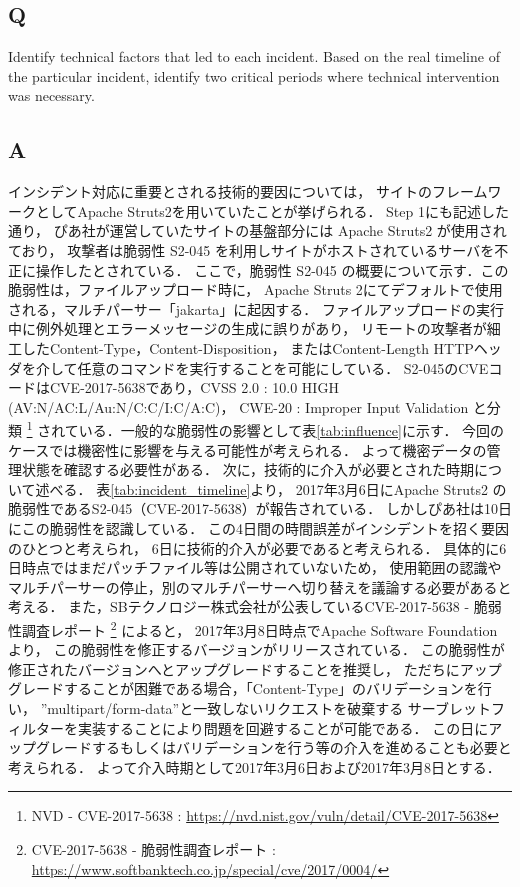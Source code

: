 \documentclass[uplatex]{jsarticle}
\begin{document}
\subsection*{Q}
Identify technical factors that led to each incident. Based on the real timeline of the particular incident, identify two critical periods where technical intervention was necessary.
\subsection*{A}
インシデント対応に重要とされる技術的要因については，
サイトのフレームワークとしてApache Struts2を用いていたことが挙げられる．
Step 1にも記述した通り，
ぴあ社が運営していたサイトの基盤部分には Apache Struts2 が使用されており，
攻撃者は脆弱性 S2-045 を利用しサイトがホストされているサーバを不正に操作したとされている．
ここで，脆弱性 S2-045 の概要について示す．この脆弱性は，ファイルアップロード時に，
Apache Struts 2にてデフォルトで使用される，マルチパーサー「jakarta」に起因する．
ファイルアップロードの実行中に例外処理とエラーメッセージの生成に誤りがあり，
リモートの攻撃者が細工したContent-Type，Content-Disposition，
またはContent-Length HTTPヘッダを介して任意のコマンドを実行することを可能にしている．
S2-045のCVEコードはCVE-2017-5638であり，CVSS 2.0 : 10.0 HIGH (AV:N/AC:L/Au:N/C:C/I:C/A:C)，
CWE-20 : Improper Input Validation と分類
\footnote{
    NVD - CVE-2017-5638
    : \url{https://nvd.nist.gov/vuln/detail/CVE-2017-5638}
}
されている．一般的な脆弱性の影響として表\ref{tab:influence}に示す．
今回のケースでは機密性に影響を与える可能性が考えられる．
よって機密データの管理状態を確認する必要性がある．
次に，技術的に介入が必要とされた時期について述べる．
表\ref{tab:incident_timeline}より，
2017年3月6日にApache Struts2 の脆弱性であるS2-045（CVE-2017-5638）が報告されている．
しかしぴあ社は10日にこの脆弱性を認識している．
この4日間の時間誤差がインシデントを招く要因のひとつと考えられ，
6日に技術的介入が必要であると考えられる．
具体的に6日時点ではまだパッチファイル等は公開されていないため，
使用範囲の認識やマルチパーサーの停止，別のマルチパーサーへ切り替えを議論する必要があると考える．
また，SBテクノロジー株式会社が公表しているCVE-2017-5638 - 脆弱性調査レポート
\footnote{
    CVE-2017-5638 - 脆弱性調査レポート
    : \url{https://www.softbanktech.co.jp/special/cve/2017/0004/}
}
によると，
2017年3月8日時点でApache Software Foundation より，
この脆弱性を修正するバージョンがリリースされている．
この脆弱性が修正されたバージョンへとアップグレードすることを推奨し，
ただちにアップグレードすることが困難である場合，「Content-Type」のバリデーションを行い，
”multipart/form-data”と一致しないリクエストを破棄する
サーブレットフィルターを実装することにより問題を回避することが可能である．
この日にアップグレードするもしくはバリデーションを行う等の介入を進めることも必要と考えられる．
よって介入時期として2017年3月6日および2017年3月8日とする．
\end{document}
